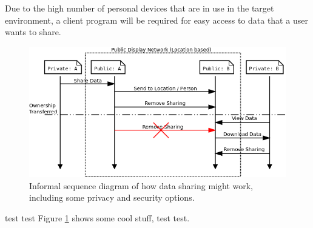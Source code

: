 Due to the high number of personal devices that are in use in the target environment, a client program will be required for easy access to data that a user wants to share.

\begin{figure}
	\centering
	\includegraphics[width=\linewidth]{img/data_sharing.png}
	\caption[Data Sharing Sequence]{Informal sequence diagram of how data sharing might work, including some privacy and security options.}
	\label{data_share_sequence}
\end{figure}

test test
Figure \ref{data_share_sequence} shows some cool stuff, test test.
